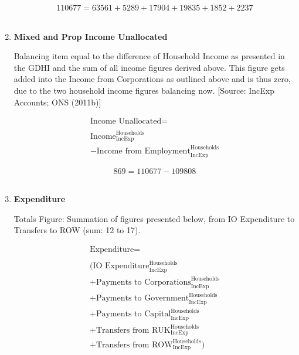 \begin{enumerate}
\begin{equation} \nonumber
110677 = 63561+5289+17904+19835+1852+2237
\end{equation}\\


\item \textbf {Mixed and Prop Income Unallocated}

Balancing item equal to the difference of Household Income as presented in the GDHI and the sum of all income figures derived above. This figure gets added into the Income from Corporations as outlined above and is thus zero, due to the two household income figures balancing now. [Source: IncExp Accounts; ONS (2011b)]

\begin{equation}
\begin{split}
\text{Income Unallocated} =  \\ \\
\text{Income}^\text{Households}_\text{IncExp}\\
-\text{Income from Employment}^\text{Households}_\text{IncExp}
\end{split} \label{eq:2.5.13}
\end{equation}


\begin{equation} \nonumber
869 = 110677-109808
\end{equation}\\


\pagebreak

\item \textbf {Expenditure}

Totals Figure: Summation of figures presented below, from IO Expenditure to Transfers to ROW (sum: 12 to 17).

\begin{equation}
\begin{split}
\text{Expenditure} =  \\ \\
(\text{IO Expenditure}^\text{Households}_\text{IncExp}\\
+\text{Payments to Corporations}^\text{Households}_\text{IncExp}\\
+\text{Payments to Government}^\text{Households}_\text{IncExp}\\
+\text{Payments to Capital}^\text{Households}_\text{IncExp}\\
+\text{Transfers from RUK}^\text{Households}_\text{IncExp}\\
+\text{Transfers from ROW}^\text{Households}_\text{IncExp})
\end{split} \label{eq:2.5.14}
\end{equation}


\end{enumerate}
